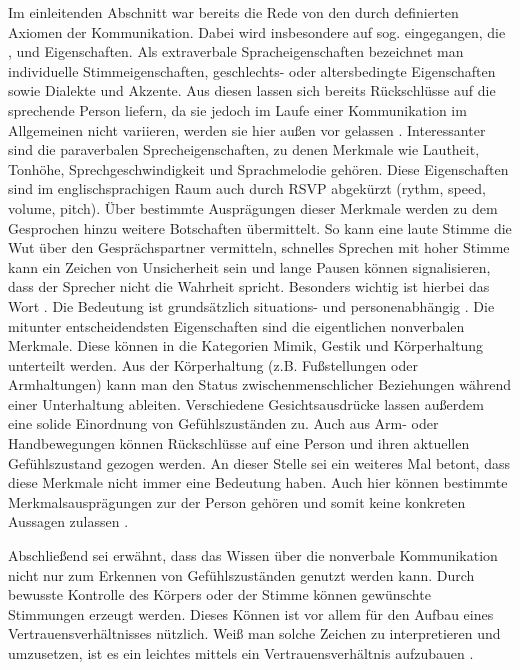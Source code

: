 Im einleitenden Abschnitt  war bereits die Rede von den durch  definierten Axiomen der Kommunikation.
Dabei wird insbesondere auf sog.  eingegangen, die ,  und  Eigenschaften.
Als extraverbale Spracheigenschaften bezeichnet man individuelle Stimmeigenschaften, geschlechts- oder altersbedingte Eigenschaften sowie Dialekte und Akzente.
Aus diesen lassen sich bereits Rückschlüsse auf die sprechende Person liefern, da sie jedoch im Laufe einer Kommunikation im Allgemeinen nicht variieren, werden sie hier außen vor gelassen \citep{grundlagen-der-kommunikation}.
Interessanter sind die paraverbalen Sprecheigenschaften, zu denen Merkmale wie Lautheit, Tonhöhe, Sprechgeschwindigkeit und Sprachmelodie gehören.
Diese Eigenschaften sind im englischsprachigen Raum auch durch RSVP abgekürzt (rythm, speed, volume, pitch).
Über bestimmte Ausprägungen dieser Merkmale werden zu dem Gesprochen hinzu weitere Botschaften übermittelt.
So kann eine laute Stimme die Wut über den Gesprächspartner vermitteln, schnelles Sprechen mit hoher Stimme kann ein Zeichen von Unsicherheit sein und lange Pausen können signalisieren, dass der Sprecher nicht die Wahrheit spricht.
Besonders wichtig ist hierbei das Wort .
Die Bedeutung ist grundsätzlich situations- und personenabhängig \citep{grundlagen-der-kommunikation}.
Die mitunter entscheidendsten Eigenschaften sind die eigentlichen nonverbalen Merkmale.
Diese können in die Kategorien Mimik, Gestik und Körperhaltung unterteilt werden.
Aus der Körperhaltung (z.B. Fußstellungen oder Armhaltungen) kann man den Status zwischenmenschlicher Beziehungen während einer Unterhaltung ableiten.
Verschiedene Gesichtsausdrücke lassen außerdem eine solide Einordnung von Gefühlszuständen zu.
Auch aus Arm- oder Handbewegungen können Rückschlüsse auf eine Person und ihren aktuellen Gefühlszustand gezogen werden.
An dieser Stelle sei ein weiteres Mal betont, dass diese Merkmale nicht immer eine Bedeutung haben.
Auch hier können bestimmte Merkmalsausprägungen zur  der Person gehören und somit keine konkreten Aussagen zulassen \citep{grundlagen-der-kommunikation}.

Abschließend sei erwähnt, dass das Wissen über die nonverbale Kommunikation nicht nur zum Erkennen von Gefühlszuständen genutzt werden kann.
Durch bewusste Kontrolle des Körpers oder der Stimme können gewünschte Stimmungen erzeugt werden.
Dieses Können ist vor allem für den Aufbau eines Vertrauensverhältnisses nützlich.
Weiß man solche Zeichen zu interpretieren und umzusetzen, ist es ein leichtes mittels  ein Vertrauensverhältnis aufzubauen \citep{hadnagy}.

